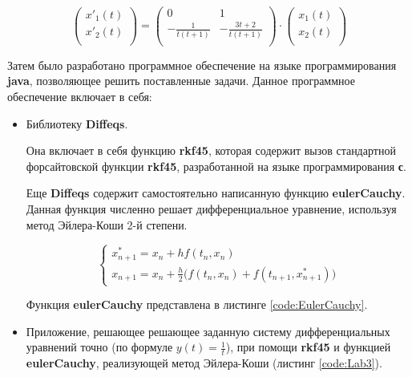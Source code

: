 \begin{displaymath}
\begin{pmatrix}
    x'_1(t) \\
    x'_2(t) \\
\end{pmatrix}
  =
\begin{pmatrix}
    0 & 1 \\
    - \frac{1}{t(t+1)} & -\frac{3t+2}{t(t+1)} \\
\end{pmatrix}
\cdot
\begin{pmatrix}
    x_1(t) \\
    x_2(t) \\
\end{pmatrix}
\end{displaymath}

Затем было разработано программное обеспечение на языке программирования \textbf{java}, позволяющее решить поставленные задачи. Данное программное обеспечение включает в себя:
\begin{itemize}

\item Библиотеку \textbf{Diffeqs}.

 Она включает в себя функцию \textbf{rkf45}, которая содержит вызов стандартной форсайтовской функции \textbf{rkf45}, разработанной на языке программирования \textbf{с}.

 Еще \textbf{Diffeqs} содержит самостоятельно написанную функцию \textbf{eulerCauchy}. Данная функция численно решает дифференциальное уравнение, используя метод Эйлера-Коши 2-й степени.
 
\begin{displaymath}
\begin{cases}
	x_{n+1}^{*} = x_n + hf(t_n, x_n)
	\\
	x_{n+1} = x_n + \frac{h}{2} \Big (f(t_n, x_n) + f(t_{n+1}, x_{n+1}^{*}) \Big) 
\end{cases}
\end{displaymath} 
 
 Функция \textbf{eulerCauchy} представлена в листинге \ref{code:EulerCauchy}.

\item Приложение, решающее решающее заданную систему дифференциальных уравнений точно (по формуле $y(t) = \frac{1}{t}$), при помощи \textbf{rkf45} и функцией \textbf{eulerCauchy}, реализующей метод Эйлера-Коши (листинг \ref{code:Lab3}).

\end{itemize}

